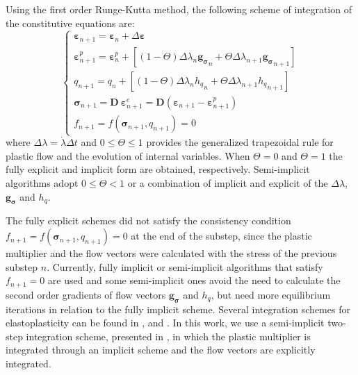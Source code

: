 \documentclass[Journal,letterpaper]{ascelike-new}
\newcommand{\dgds}{\boldsymbol{g_\sigma}}
\newcommand{\Dsdee}{\boldsymbol{D}}
\newcommand{\hl}{{h_q}}
\newcommand{\strain}{\boldsymbol{\varepsilon}}
\newcommand{\stress}{\boldsymbol{\sigma}}
\begin{document}
Using the first order Runge-Kutta method, the following scheme of integration of the constitutive equations are:
\begin{equation}
	\label{eq:esquema_int_constitutiva_ep}
	\left\{
\begin{array}{lcl}
	\strain_{n+1} = \strain_n + \Delta \strain \\
	\strain_{n+1}^p = \strain_n^p + \left[(1-\Theta) \Delta \lambda_n \dgds_n + \Theta \Delta \lambda_{n+1} \dgds_{n+1}\right] \\
	q_{n+1} = q_n + \left[(1-\Theta) \Delta \lambda_n \hl_n + \Theta \Delta \lambda_{n+1} \hl_{n+1}\right] \\	
	\stress_{n+1} = \Dsdee~\strain_{n+1}^e = \Dsdee( \strain_{n+1} - \strain_{n+1}^p) \\
	f_{n+1} = f(\stress_{n+1},q_{n+1}) = 0		
\end{array}
\right.
\end{equation}
where $\Delta \lambda = \dot\lambda\Delta t$ and $0 \leq \Theta \leq 1$ provides the generalized trapezoidal rule for  plastic flow and the evolution of internal variables. When $\Theta = 0$ and $\Theta = 1$ the fully explicit and implicit form are obtained, respectively. Semi-implicit algorithms adopt $0 \leq \Theta < 1$ or a combination of implicit and explicit of the $\Delta \lambda$, $\dgds$ and $\hl$. 

The fully explicit schemes did not satisfy the consistency condition $f_{n+1}=f(\stress_{n+1},q_{n+1})=0$ at the end of the substep, since the plastic multiplier and the flow vectors were calculated with the stress of the previous substep $n$. Currently, fully implicit or semi-implicit algorithms that satisfy $f_{n+1} = 0$ are used and some semi-implicit ones avoid the need to calculate the second order gradients of flow vectors $\dgds$ and $\hl$, but need more equilibrium iterations in relation to the fully implicit scheme. Several integration schemes for elastoplasticity can be found in ,  and . In this work, we use a semi-implicit two-step integration scheme, presented in , in which the plastic multiplier is integrated through an implicit scheme and the flow vectors are explicitly integrated.
\end{document}
